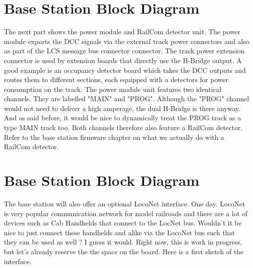 
\section{Base Station Block Diagram}

The next part shows the power module and RailCom detector unit. The power module exports the DCC signals via the external track power connectors and also as part of the LCS message bus connector connector. The track power extension connector is used by extension boards that directly use the H-Bridge output. A good example is an occupancy detector board which takes the DCC outputs and routes them to different sections, each equipped with a detectors for power consumption on the track. The power module unit features two identical channels. They are labelled "MAIN" and "PROG". Although the "PROG" channel would not need to deliver a high amperage, the dual H-Bridge is there anyway. And as said before, it would be nice to dynamically treat the PROG track as a type MAIN track too. Both channels therefore also feature a RailCom detector. Refer to the base station firmware chapter on what we actually do with a RailCom detector.


\section{Base Station Block Diagram}
The base station will also offer an optional LocoNet interface. One day. LocoNet is very popular communication network for model railroads and there are a lot of devices such as Cab Handhelds that connect to the LocNet bus. Wouldn't it be nice to just connect these handhelds and alike via the LocoNet bus such that they can be used as well ? I guess it would. Right now, this is work in progress, but let's already reserve the the space on the board. Here is a first sketch of the interface.

